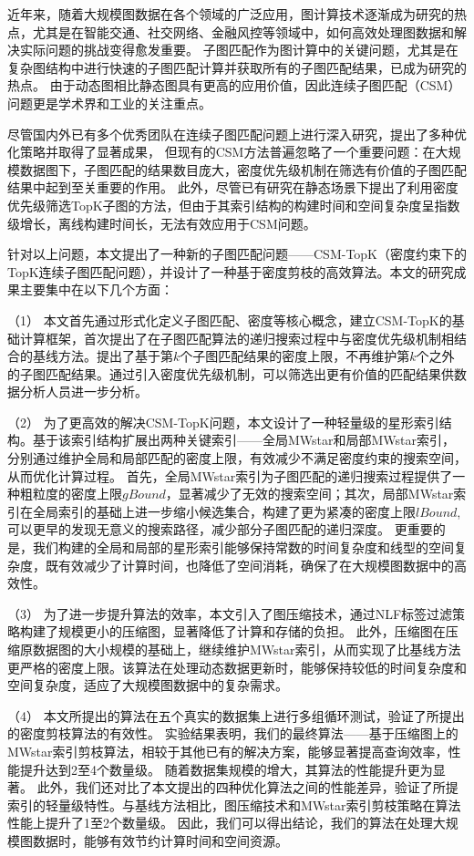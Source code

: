 \begin{summary}
	近年来，随着大规模图数据在各个领域的广泛应用，图计算技术逐渐成为研究的热点，尤其是在智能交通、社交网络、金融风控等领域中，如何高效处理图数据和解决实际问题的挑战变得愈发重要。
	子图匹配作为图计算中的关键问题，尤其是在复杂图结构中进行快速的子图匹配计算并获取所有的子图匹配结果，已成为研究的热点。
	由于动态图相比静态图具有更高的应用价值，因此连续子图匹配（CSM）问题更是学术界和工业的关注重点。

	尽管国内外已有多个优秀团队在连续子图匹配问题上进行深入研究，提出了多种优化策略并取得了显著成果，
	但现有的CSM方法普遍忽略了一个重要问题：在大规模数据图下，子图匹配的结果数目庞大，密度优先级机制在筛选有价值的子图匹配结果中起到至关重要的作用。
	此外，尽管已有研究在静态场景下提出了利用密度优先级筛选TopK子图的方法，但由于其索引结构的构建时间和空间复杂度呈指数级增长，离线构建时间长，无法有效应用于CSM问题。
	
	针对以上问题，本文提出了一种新的子图匹配问题——CSM-TopK（密度约束下的TopK连续子图匹配问题），并设计了一种基于密度剪枝的高效算法。本文的研究成果主要集中在以下几个方面：
		
		（1） 本文首先通过形式化定义子图匹配、密度等核心概念，建立CSM-TopK的基础计算框架，首次提出了在子图匹配算法的递归搜索过程中与密度优先级机制相结合的基线方法。提出了基于第$k$个子图匹配结果的密度上限，不再维护第$k$个之外的子图匹配结果。通过引入密度优先级机制，可以筛选出更有价值的匹配结果供数据分析人员进一步分析。

		（2） 为了更高效的解决CSM-TopK问题，本文设计了一种轻量级的星形索引结构。基于该索引结构扩展出两种关键索引——全局MWstar和局部MWstar索引，分别通过维护全局和局部匹配的密度上限，有效减少不满足密度约束的搜索空间，从而优化计算过程。
		首先，全局MWstar索引为子图匹配的递归搜索过程提供了一种粗粒度的密度上限$gBound$，显著减少了无效的搜索空间；其次，局部MWstar索引在全局索引的基础上进一步缩小候选集合，构建了更为紧凑的密度上限$lBound$,可以更早的发现无意义的搜索路径，减少部分子图匹配的递归深度。
		更重要的是，我们构建的全局和局部的星形索引能够保持常数的时间复杂度和线型的空间复杂度，既有效减少了计算时间，也降低了空间消耗，确保了在大规模图数据中的高效性。

		（3） 为了进一步提升算法的效率，本文引入了图压缩技术，通过NLF标签过滤策略构建了规模更小的压缩图，显著降低了计算和存储的负担。
		此外，压缩图在压缩原数据图的大小规模的基础上，继续维护MWstar索引，从而实现了比基线方法更严格的密度上限。该算法在处理动态数据更新时，能够保持较低的时间复杂度和空间复杂度，适应了大规模图数据中的复杂需求。
		
		（4） 本文所提出的算法在五个真实的数据集上进行多组循环测试，验证了所提出的密度剪枝算法的有效性。
		实验结果表明，我们的最终算法——基于压缩图上的MWstar索引剪枝算法，相较于其他已有的解决方案，能够显著提高查询效率，性能提升达到2至4个数量级。
		随着数据集规模的增大，其算法的性能提升更为显著。
		此外，我们还对比了本文提出的四种优化算法之间的性能差异，验证了所提索引的轻量级特性。与基线方法相比，图压缩技术和MWstar索引剪枝策略在算法性能上提升了1至2个数量级。
		因此，我们可以得出结论，我们的算法在处理大规模图数据时，能够有效节约计算时间和空间资源。
	

\end{summary}
